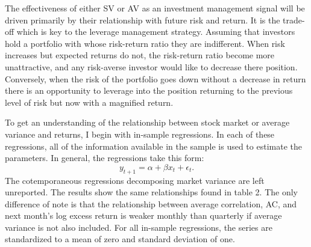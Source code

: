 The effectiveness of either SV or AV as an investment management signal will be driven primarily by their relationship with future risk and return. It is the trade-off which is key to the leverage management strategy. Assuming that investors hold a portfolio with whose risk-return ratio they are indifferent. When risk increases but expected returns do not, the risk-return ratio become more unattractive, and any risk-averse investor would like to decrease there position. Conversely, when the risk of the portfolio goes down without a decrease in return there is an opportunity to leverage into the position returning to the previous level of risk but now with a magnified return.

To get an understanding of the relationship between stock market or average variance and returns, I begin with in-sample regressions. In each of these regressions, all of the information available in the sample is used to estimate the parameters. In general, the regressions take this form: 
\begin{equation}
	y_{t+1} = \alpha + \beta x_{t} + \epsilon_{t}.
\end{equation}
The cotemporaneous regressions decomposing market variance are left unreported. The results show the same relationships found in  \citet{pollet_average_2010} table 2. The only difference of note is that the relationship between average correlation, AC, and next month’s log excess return is weaker monthly than quarterly if average variance is not also included. For all in-sample regressions, the series are standardized to a mean of zero and standard deviation of one.
